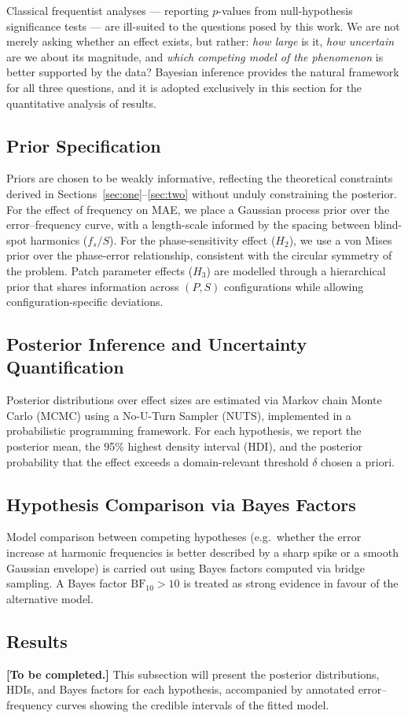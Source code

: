 Classical frequentist analyses — reporting $p$-values from null-hypothesis significance tests — are ill-suited to the questions posed by this work.
We are not merely asking whether an effect exists, but rather: \emph{how large} is it, \emph{how uncertain} are we about its magnitude, and \emph{which competing model of the phenomenon} is better supported by the data?
Bayesian inference provides the natural framework for all three questions, and it is adopted exclusively in this section for the quantitative analysis of results.

\subsection{Prior Specification}

Priors are chosen to be weakly informative, reflecting the theoretical constraints derived in Sections~\ref{sec:one}–\ref{sec:two} without unduly constraining the posterior.
For the effect of frequency on MAE, we place a Gaussian process prior over the error–frequency curve, with a length-scale informed by the spacing between blind-spot harmonics ($f_s / S$).
For the phase-sensitivity effect ($H_2$), we use a von Mises prior over the phase-error relationship, consistent with the circular symmetry of the problem.
Patch parameter effects ($H_3$) are modelled through a hierarchical prior that shares information across $(P, S)$ configurations while allowing configuration-specific deviations.

\subsection{Posterior Inference and Uncertainty Quantification}

Posterior distributions over effect sizes are estimated via Markov chain Monte Carlo (MCMC) using a No-U-Turn Sampler (NUTS), implemented in a probabilistic programming framework.
For each hypothesis, we report the posterior mean, the 95\% highest density interval (HDI), and the posterior probability that the effect exceeds a domain-relevant threshold $\delta$ chosen a priori.

\subsection{Hypothesis Comparison via Bayes Factors}

Model comparison between competing hypotheses (e.g.\ whether the error increase at harmonic frequencies is better described by a sharp spike or a smooth Gaussian envelope) is carried out using Bayes factors computed via bridge sampling.
A Bayes factor $\mathrm{BF}_{10} > 10$ is treated as strong evidence in favour of the alternative model.

\subsection{Results}

\noindent\textbf{[To be completed.]}
This subsection will present the posterior distributions, HDIs, and Bayes factors for each hypothesis, accompanied by annotated error–frequency curves showing the credible intervals of the fitted model.
